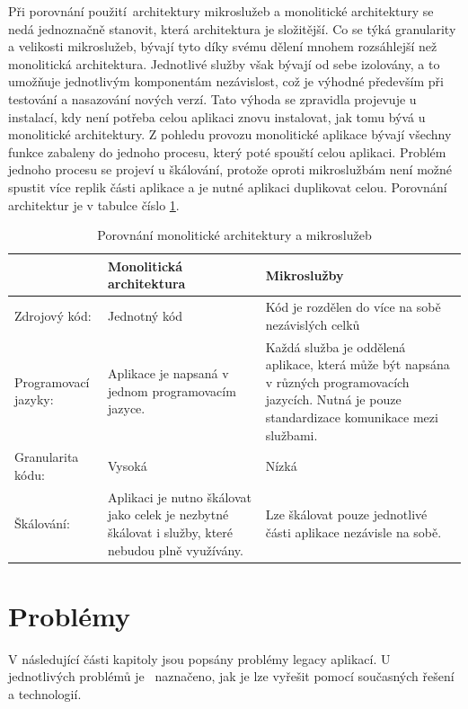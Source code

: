 Při porovnání použití architektury mikroslužeb a monolitické architektury se nedá jednoznačně stanovit, která architektura je složitější. Co se týká granularity a velikosti mikroslužeb, bývají tyto díky svému dělení mnohem rozsáhlejší než monolitická architektura. Jednotlivé služby však bývají od sebe izolovány, a to umožňuje jednotlivým komponentám nezávislost, což je výhodné především při testování a nasazování nových verzí. Tato výhoda se zpravidla projevuje u instalací, kdy není potřeba celou aplikaci znovu instalovat, jak tomu bývá u monolitické architektury. Z pohledu provozu monolitické aplikace bývají všechny funkce zabaleny do jednoho procesu, který poté spouští celou aplikaci. Problém jednoho procesu se projeví u škálování, protože oproti mikroslužbám není možné spustit více replik části aplikace a je nutné aplikaci duplikovat celou. Porovnání architektur je v tabulce číslo \ref{tbl:mono_ms}.

\begin{table}[H]
\begin{center}
\caption{Porovnání monolitické architektury a mikroslužeb} 
\label{tbl:mono_ms}
\begin{tabular}{|p{40mm}|p{50mm}|p{50mm}|}
\hline
  ~   & Monolitická architektura & Mikroslužby \\    \hline
Zdrojový kód: &  Jednotný kód &  Kód je rozdělen do více na sobě nezávislých celků  \\    \hline
Programovací jazyky: &  Aplikace je napsaná v jednom programovacím jazyce. & Každá služba je oddělená aplikace, která může být napsána v různých programovacích jazycích. Nutná je pouze standardizace komunikace mezi službami. \\    \hline
Granularita kódu: & Vysoká & Nízká  \\    \hline
Škálování: & Aplikaci je nutno škálovat jako celek je nezbytné škálovat i služby, které nebudou plně využívány. & Lze škálovat pouze jednotlivé části aplikace nezávisle na sobě. \\    \hline

\end{tabular}
\end{center}
\end{table}

\section{Problémy}
V následující části kapitoly jsou popsány problémy legacy aplikací. U jednotlivých problémů je  naznačeno, jak je lze vyřešit pomocí současných řešení a technologií.

